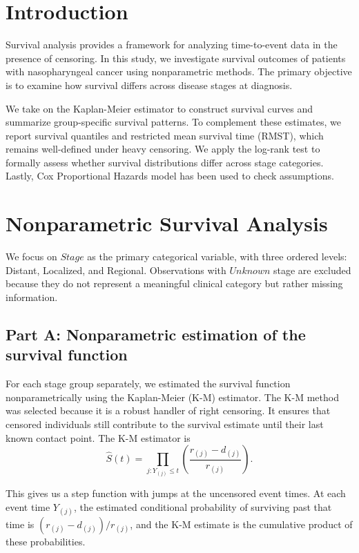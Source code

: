 \documentclass[12pt]{article}
\begin{document}
\section*{Introduction}

Survival analysis provides a framework for analyzing time-to-event data in the presence of censoring. In this study, we investigate survival outcomes of patients with nasopharyngeal cancer using nonparametric methods. The primary objective is to examine how survival differs across disease stages at diagnosis.

We take on the Kaplan-Meier estimator to construct survival curves and summarize group-specific survival patterns. To complement these estimates, we report survival quantiles and restricted mean survival time (RMST), which remains well-defined under heavy censoring. We apply the log-rank test to formally assess whether survival distributions differ across stage categories. Lastly, Cox Proportional Hazards model has been used to check assumptions.
\section*{Nonparametric Survival Analysis}

We focus on $Stage$ as the primary categorical variable, with three ordered levels: Distant, Localized, and Regional. Observations with $Unknown$ stage are excluded because they do not represent a meaningful clinical category but rather missing information.

\subsection*{Part A: Nonparametric estimation of the survival function}

For each stage group separately, we estimated the survival function nonparametrically using the Kaplan-Meier (K-M) estimator. The K-M method was selected because it is a robust handler of right censoring. It ensures that censored individuals still contribute to the survival estimate until their last known contact point. The K-M estimator is
\[
\hat{S}(t) = \prod_{j: Y_{(j)} \leq t} \left( \frac{r_{(j)} - d_{(j)}}{r_{(j)}} \right).
\]

This gives us a step function with jumps at the uncensored event times. At each event time $Y_{(j)}$, the estimated conditional probability of surviving past that time is $(r_{(j)} - d_{(j)})/r_{(j)}$, and the K-M estimate is the cumulative product of these probabilities. 
\end{document}
